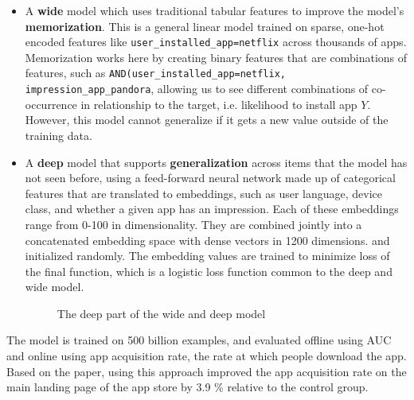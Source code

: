 \documentclass[11pt, table]{diazessay} %
\begin{document}
\begin{sloppypar}
\begin{itemize}
  \item A \textbf{wide} model which uses traditional tabular features to improve the model's \textbf{memorization}. This is a general linear model trained on sparse, one-hot encoded features like \texttt{user_installed_app=netflix} across thousands of apps. Memorization works here by creating binary features that are combinations of features, such as \texttt{AND(user_installed_app=netflix, impression_app_pandora}, allowing us to see different combinations of co-occurrence in relationship to the target, i.e. likelihood to install app $Y$. However, this model cannot generalize if it gets a new value outside of the training data.
  \item A \textbf{deep} model that supports \textbf{generalization} across items that the model has not seen before, using a feed-forward neural network made up of categorical features that are translated to embeddings, such as user language, device class, and whether a given app has an impression. Each of these embeddings range from 0-100 in dimensionality. They are combined jointly into a concatenated embedding space with dense vectors in 1200 dimensions.  and initialized randomly. The embedding values are trained to minimize loss of the final function, which is a logistic loss function common to the deep and wide model.  
\begin{figure}[H]
\caption{The deep part of the wide and deep model\citep{cheng2016wide}}
\end{figure}
\end{itemize}

The model is trained on 500 billion examples, and evaluated offline using AUC and online using app acquisition rate, the rate at which people download the app. Based on the paper, using this approach improved the app acquisition rate on the main landing page of the app store by 3.9 \% relative to the control group.



\end{sloppypar}
\end{document}
